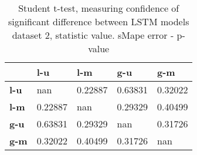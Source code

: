 \begin{table}[h]
\centering
\caption{Student t-test, measuring confidence of significant difference between LSTM models dataset 2, statistic value. sMape error - p-value}
\label{table:ttest-p-values-lstm-experiments-sMAPE-dataset-2}
\begin{tabular}{lllll}
\toprule
{} &      l-u &      l-m &      g-u &      g-m \\
\midrule
\textbf{l-u} &      nan &  0.22887 &  0.63831 &  0.32022 \\
\textbf{l-m} &  0.22887 &      nan &  0.29329 &  0.40499 \\
\textbf{g-u} &  0.63831 &  0.29329 &      nan &  0.31726 \\
\textbf{g-m} &  0.32022 &  0.40499 &  0.31726 &      nan \\
\bottomrule
\end{tabular}
\end{table}
